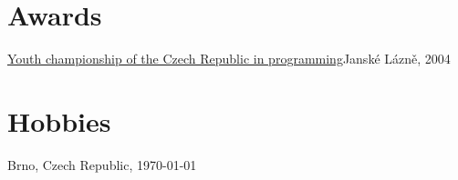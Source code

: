 \documentclass[11pt,a4paper]{moderncv}
\begin{document}
\section{Awards}
    {\href{http://www.stv.cz/pgm_cr/mcr2004vm.html}{Youth championship of the
    Czech Republic in programming}}{Janské Lázně, 2004}{}{}

\section{Hobbies}
\renewcommand{\listitemsymbol}{\Neutral}

\renewcommand{\refname}{Publications, talks}
\makeatletter
\def\mybiblabel#1(#2){\hskip 0pt plus 1filll\relax #2}
\def\@biblabel#1{\mybiblabel #1}
\makeatother
\nocite{*}



\vfill
Brno, Czech Republic, \today
\end{document}
